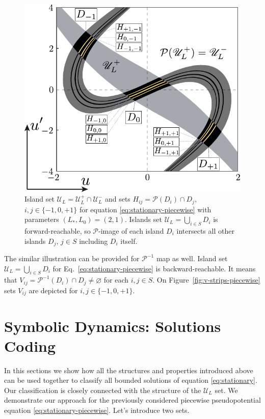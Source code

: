 \begin{figure}[h]
\centering
	\includegraphics[scale = 1]{pic/h-strips for piecewise equation}
	\caption{
		Island set $\mathscr{U}_L = \mathscr{U}_L^+ \cap \mathscr{U}_L^-$ and sets $H_{ij} = \mathcal{P}(D_i) \cap D_j$, $i, j \in \{ -1, 0, +1 \}$ for equation \eqref{eq:stationary-piecewise} with parameters $(L_*, L_0) = (2, 1)$.
		Islands set $\mathscr{U}_L = \bigcup_{i \in S} D_i$ is forward-reachable, so $\mathcal{P}$-image of each island $D_i$ intersects all other islands $D_j$, $j \in S$ including $D_i$ itself.
	}
\label{fig:h-strips-piecewise}
\end{figure}

The similar illustration can be provided for $\mathcal{P}^{-1}$ map as well.
Island set $\mathscr{U}_L = \bigcup_{i \in S} D_i$ for Eq.~\eqref{eq:stationary-piecewise} is backward-reachable.
It means that $V_{ij} = \mathcal{P}^{-1}(D_i) \cap D_j \neq \varnothing$ for each $i, j \in S$.
On Figure~\ref{fig:v-strips-piecewise} sets $V_{ij}$ are depicted for $i, j \in \{ -1, 0, +1 \}$.

\section{Symbolic Dynamics: Solutions Coding}

In this sections we show how all the structures and properties introduced above can be used together to classify all bounded solutions of equation \eqref{eq:stationary}.
Our classification is closely connected with the structure of the $\mathscr{U}_L$ set.
We demonstrate our approach for the previously considered piecewise pseudopotential equation \eqref{eq:stationary-piecewise}.
Let's introduce two sets.

